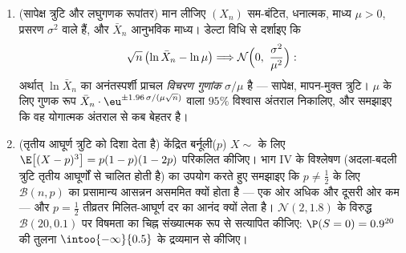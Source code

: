\begin{problem}[{सप्ताहांत समस्या --- प्रतिस्थापन विधि}]
\begin{enumerate}[resume]
  \item (सापेक्ष त्रुटि और लघुगणक रूपांतर) मान लीजिए $(X_n)$
         सम-बंटित, धनात्मक, माध्य $\mu > 0$, प्रसरण $\sigma^2$ वाले
        हैं, और $\bar X_n$ आनुभविक माध्य। डेल्टा विधि से दर्शाइए कि
        \[
        \sqrt n\,\bigl(\ln\bar X_n - \ln\mu\bigr)
        \Longrightarrow
        \mathcal N\Bigl(0,\ \frac{\sigma^2}{\mu^2}\Bigr) :
        \]
        अर्थात् $\ln\bar X_n$ का अनंतस्पर्शी प्राचल \emph{विचरण गुणांक}
        $\sigma/\mu$ है --- सापेक्ष, मापन-मुक्त त्रुटि। $\mu$ के लिए गुणक
        रूप $\bar X_n\cdot\eu^{\pm1.96\,\sigma/(\mu\sqrt
        n)}$ वाला $95\%$ विश्वास अंतराल निकालिए, और समझाइए कि
        वह योगात्मक अंतराल से कब बेहतर है।
  \item (तृतीय आघूर्ण त्रुटि को दिशा देता है) केंद्रित बर्नूली($p$)
        $X \sim$ के लिए $\E\bigl[(X -
        p)^3\bigr] = p(1-p)(1-2p)$ परिकलित कीजिए। भाग IV के विश्लेषण (अदला-बदली
        त्रुटि तृतीय आघूर्णों से चालित होती है) का उपयोग करते हुए
        समझाइए कि $p \neq \frac12$ के लिए $\mathcal B(n, p)$ का प्रसामान्य आसन्नन असममित
        क्यों होता है --- एक ओर अधिक और दूसरी ओर कम --- और $p = \frac12$
        तीव्रतर मिलित-आघूर्ण दर का आनंद क्यों लेता है। $\mathcal N(2, 1.8)$ के
        विरुद्ध $\mathcal
        B(20, 0.1)$ पर विषमता का चिह्न संख्यात्मक रूप से सत्यापित
        कीजिए: $\P(S = 0) = 0.9^{20}$ की तुलना $\intoo{-\infty}{0.5}$ के  द्रव्यमान से कीजिए।
\end{enumerate}
\end{problem}
